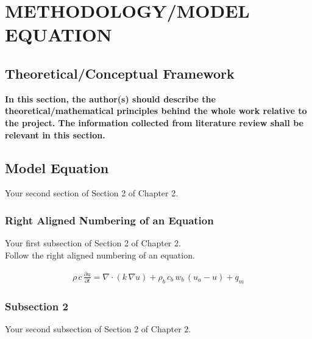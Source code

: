 
\chapter{METHODOLOGY/MODEL EQUATION}

\section{{\bf{Theoretical/Conceptual Framework}}}
{\bf\color{red}In this section, the author(s) should describe the theoretical/mathematical principles behind the whole work relative to the project. The information collected from literature review shall be relevant in this section.
}


\section{{\bf{Model Equation }}}
Your second section of Section 2 of Chapter 2.
\subsection{\bf Right Aligned Numbering of an Equation}
Your first subsection of Section 2 of Chapter 2.\\
Follow the right aligned numbering of an equation.

\begin{eqnarray}
\rho\,c\,\frac{\partial u}{\partial t} = \nabla \cdot \left( k\, \nabla u \right) + \rho_b\,c_b\,w_b\,(u_a - u) + q_m 
\end{eqnarray}

\subsection{\bf Subsection 2}
Your second subsection of Section 2 of Chapter 2.
